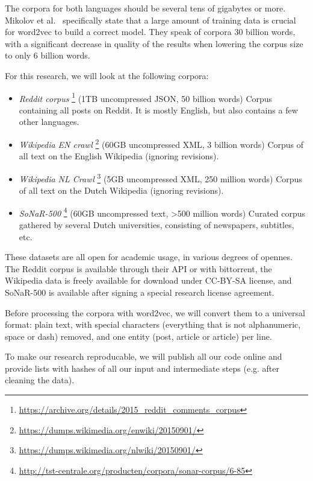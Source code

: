 The corpora for both languages should be several tens of gigabytes or more. Mikolov et al.~\cite{mikolov2013distributed} specifically state that a large amount of training data is crucial for word2vec to build a correct model. They speak of corpora 30 billion words, with a significant decrease in quality of the results when lowering the corpus size to only 6 billion words.

For this research, we will look at the following corpora:
\begin{itemize}
  \item \textit{Reddit corpus}
    \footnote{\url{https://archive.org/details/2015_reddit_comments_corpus}}
    (1TB uncompressed JSON, 50 billion words) Corpus containing all posts on Reddit. It is mostly English, but also contains a few other languages.
  \item \textit{Wikipedia EN crawl} 
    \footnote{\url{https://dumps.wikimedia.org/enwiki/20150901/}}
    (60GB uncompressed XML, 3 billion words) Corpus of all text on the English Wikipedia (ignoring revisions).
  \item \textit{Wikipedia NL Crawl} 
    \footnote{\url{https://dumps.wikimedia.org/nlwiki/20150901/}}
    (5GB uncompressed XML, 250 million words) Corpus of all text on the Dutch Wikipedia (ignoring revisions).
  \item \textit{SoNaR-500} 
    \footnote{\url{http://tst-centrale.org/producten/corpora/sonar-corpus/6-85}}
    (60GB uncompressed text, >500 million words) Curated corpus gathered by several Dutch universities, consisting of newspapers, subtitles, etc.
\end{itemize}

These datasets are all open for academic usage, in various degrees of opennes. The Reddit corpus is available through their API or with bittorrent, the Wikipedia data is freely available for download under CC-BY-SA license, and SoNaR-500 is available after signing a special research license agreement.

Before processing the corpora with word2vec, we will convert them to a universal format: plain text, with special characters (everything that is not alphanumeric, space or dash) removed, and one entity (post, article or article) per line.

To make our research reproducable, we will publish all our code online and provide lists with hashes of all our input and intermediate steps (e.g. after cleaning the data).